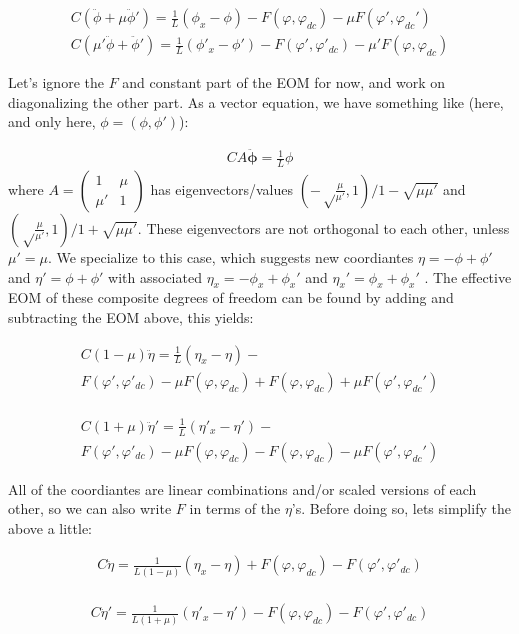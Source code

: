 \documentclass[paper=a4, twocolumn, fontsize=10pt]{article} %
\numberwithin{equation}{section} %
\numberwithin{figure}{section} %
\numberwithin{table}{section} %
\begin{document}
\begin{align}
    C \left( \ddot{\phi} + \mu \ddot{\phi}'\right) = \frac{1}{L} (\phi_x-\phi) - F(\varphi, \varphi_{dc}) - \mu F(\varphi',\varphi_{dc}')
    \\
    C \left( \mu' \ddot{\phi} + \ddot{\phi}'\right) = \frac{1}{L} (\phi'_x-\phi') - F(\varphi', \varphi'_{dc}) - \mu' F(\varphi,\varphi_{dc})
\end{align}

Let's ignore the $F$ and constant part of the EOM for now, and work on diagonalizing the other part. As a vector equation, we have something like (here, and only here, $\phi = (\phi, \phi')$):

\begin{align}{
    C A \ddot{\mathbf{\phi}} = \frac{1}{L} \phi 
}
\end{align}
where $A = \begin{pmatrix} 1 & \mu \\ \mu' & 1 \end{pmatrix}  $ has eigenvectors/values $(-\sqrt\frac{\mu}{\mu'}, 1)/1-\sqrt{\mu\mu'}$ and $(\sqrt\frac{\mu}{\mu'}, 1)/1+\sqrt{\mu\mu'}$. These eigenvectors are not orthogonal to each other, unless $\mu'=\mu$. We specialize to this case, which suggests new coordiantes $\eta = -\phi +\phi'$ and $\eta' = \phi+\phi'$ with associated $\eta_x = -\phi_x + \phi_x'$ and $\eta_x' = \phi_x + \phi_x'$ . The effective EOM of these composite degrees of freedom can be found by adding and subtracting the EOM above, this yields:

\begin{multline}
    C(1-\mu) \ddot{\eta} = \frac{1}{L} (\eta_x-\eta) - \\ F(\varphi', \varphi'_{dc}) - \mu F(\varphi,\varphi_{dc}) + F(\varphi, \varphi_{dc}) + \mu F(\varphi',\varphi_{dc}')
\end{multline}
    \\
\begin{multline}
    C(1+\mu) \ddot{\eta}' = \frac{1}{L} (\eta'_x-\eta') - \\ F(\varphi', \varphi'_{dc}) - \mu F(\varphi,\varphi_{dc}) - F(\varphi, \varphi_{dc}) - \mu F(\varphi',\varphi_{dc}')
\end{multline}

All of the coordiantes are linear combinations and/or scaled versions of each other, so we can also write $F$ in terms of the $\eta$'s. Before doing so, lets simplify the above a little: 

\begin{multline}
    C \ddot{\eta} = \frac{1}{L(1-\mu)} (\eta_x-\eta) + F(\varphi, \varphi_{dc}) - F(\varphi', \varphi'_{dc})
\end{multline}
    \\
\begin{multline}
    C \ddot{\eta}' = \frac{1}{L(1+\mu)} (\eta'_x-\eta') - F(\varphi, \varphi_{dc}) - F(\varphi', \varphi'_{dc})
\end{multline}
\end{document}
